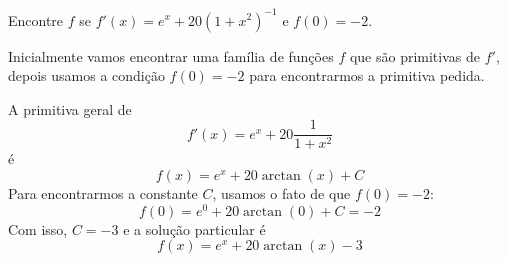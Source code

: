 \begin{example}
  Encontre $f$ se $f'(x)= e^x+20(1+x^2)^{-1}$ e $f(0)=-2$.

  \solution
  Inicialmente vamos encontrar uma família de funções $f$ que são primitivas de
  $f'$, depois usamos a condição $f(0)=-2$ para encontrarmos a primitiva
  pedida.

  A primitiva geral de
  \[
  f'(x)= e^x+20 \frac{1}{1+x^2}
  \]
  é
  \[
  f(x)=e^x+20 \arctan(x)+C
  \]
  Para encontrarmos a constante $C$, usamos o fato de que $f(0)=-2$:
  \[
  f(0)=e^0+20 \arctan(0)+C=-2
  \]
  Com isso, $C=-3$ e a solução particular é
  \[
  f(x)=e^x+20 \arctan(x)-3
  \]
\end{example}

